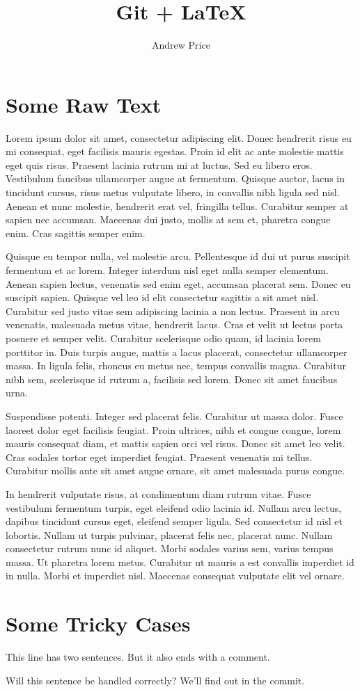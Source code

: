 \documentclass[12pt,twocolumn,letter]{article}
\begin{document}
\title{Git + \LaTeX}
\author{Andrew Price}
\maketitle

\section{Some Raw Text}
Lorem ipsum dolor sit amet, consectetur adipiscing elit. %
Donec hendrerit risus eu mi consequat, eget facilisis mauris egestas. %
Proin id elit ac ante molestie mattis eget quis risus. %
Praesent lacinia rutrum mi at luctus. %
Sed eu libero eros. %
Vestibulum faucibus ullamcorper augue at fermentum. %
Quisque auctor, lacus in tincidunt cursus, risus metus vulputate libero, in convallis nibh ligula sed nisl. %
Aenean et nunc molestie, hendrerit erat vel, fringilla tellus. %
Curabitur semper at sapien nec accumsan. %
Maecenas dui justo, mollis at sem et, pharetra congue enim. %
Cras sagittis semper enim.

Quisque eu tempor nulla, vel molestie arcu. %
Pellentesque id dui ut purus suscipit fermentum et ac lorem. %
Integer interdum nisl eget nulla semper elementum. %
Aenean sapien lectus, venenatis sed enim eget, accumsan placerat sem. %
Donec eu suscipit sapien. %
Quisque vel leo id elit consectetur sagittis a sit amet nisl. %
Curabitur sed justo vitae sem adipiscing lacinia a non lectus. %
Praesent in arcu venenatis, malesuada metus vitae, hendrerit lacus. %
Cras et velit ut lectus porta posuere et semper velit. %
Curabitur scelerisque odio quam, id lacinia lorem porttitor in. %
Duis turpis augue, mattis a lacus placerat, consectetur ullamcorper massa. %
In ligula felis, rhoncus eu metus nec, tempus convallis magna. %
Curabitur nibh sem, scelerisque id rutrum a, facilisis sed lorem. %
Donec sit amet faucibus urna.

Suspendisse potenti. %
Integer sed placerat felis. %
Curabitur ut massa dolor. %
Fusce laoreet dolor eget facilisis feugiat. %
Proin ultrices, nibh et congue congue, lorem mauris consequat diam, et mattis sapien orci vel risus. %
Donec sit amet leo velit. %
Cras sodales tortor eget imperdiet feugiat. %
Praesent venenatis mi tellus. %
Curabitur mollis ante sit amet augue ornare, sit amet malesuada purus congue.

In hendrerit vulputate risus, at condimentum diam rutrum vitae. %
Fusce vestibulum fermentum turpis, eget eleifend odio lacinia id. %
Nullam arcu lectus, dapibus tincidunt cursus eget, eleifend semper ligula. %
Sed consectetur id nisl et lobortis. %
Nullam ut turpis pulvinar, placerat felis nec, placerat nunc. %
Nullam consectetur rutrum nunc id aliquet. %
Morbi sodales varius sem, varius tempus massa. %
Ut pharetra lorem metus. %
Curabitur ut mauris a est convallis imperdiet id in nulla. %
Morbi et imperdiet nisl. %
Maecenas consequat vulputate elit vel ornare.


\section{Some Tricky Cases}

This line has two sentences. But it also ends with a comment. %

Will this sentence be handled correctly? %
We'll find out in the commit.
\end{document}
